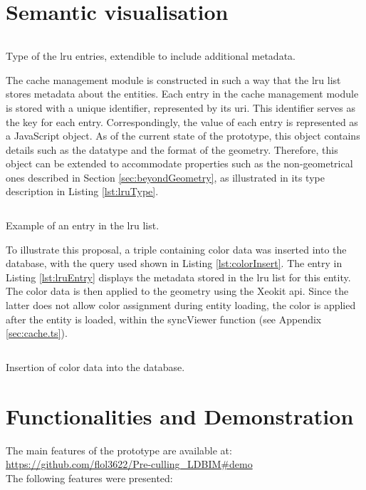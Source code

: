 \section{Semantic visualisation} \label{sec:semanticVis}
\begin{listing}[H]
    \inputminted{ts}{dynamicQueries/colorize/type.ts}
    \caption[\acs{lru} entry type]{Type of the \ac{lru} entries, extendible to include additional metadata.}
    \label{lst:lruType}
\end{listing}

The cache management module is constructed in such a way that the \ac{lru} list stores metadata about the entities. Each entry in the cache management module is stored with a unique identifier, represented by its \ac{uri}. This identifier serves as the key for each entry. Correspondingly, the value of each entry is represented as a JavaScript object. As of the current state of the prototype, this object contains details such as the datatype and the format of the geometry. Therefore, this object can be extended to accommodate properties such as the non-geometrical ones described in Section \ref{sec:beyondGeometry}, as illustrated in its type description in Listing \ref{lst:lruType}.

\begin{listing}[H]
    \inputminted{json}{dynamicQueries/colorize/entry.json}
    \caption[LRU entry]{Example of an entry in the \ac{lru} list.}
    \label{lst:lruEntry}
\end{listing}

To illustrate this proposal, a triple containing color data was inserted into the database, with the query used shown in Listing \ref{lst:colorInsert}. The entry in Listing \ref{lst:lruEntry} displays the metadata stored in the \ac{lru} list for this entity. The color data is then applied to the geometry using the Xeokit \ac{api}. Since the latter does not allow color assignment during entity loading, the color is applied after the entity is loaded, within the syncViewer function (see Appendix \ref{sec:cache.ts}).

\begin{listing}[H]
    \inputminted{sparql}{dynamicQueries/colorize/insert.rq}
    \caption[Insert color data]{Insertion of color data into the database.}
    \label{lst:colorInsert}
\end{listing}

\section{Functionalities and Demonstration}
The main features of the prototype are available at:\\
\url{https://github.com/flol3622/Pre-culling_LDBIM#demo}\\
The following features were presented:

